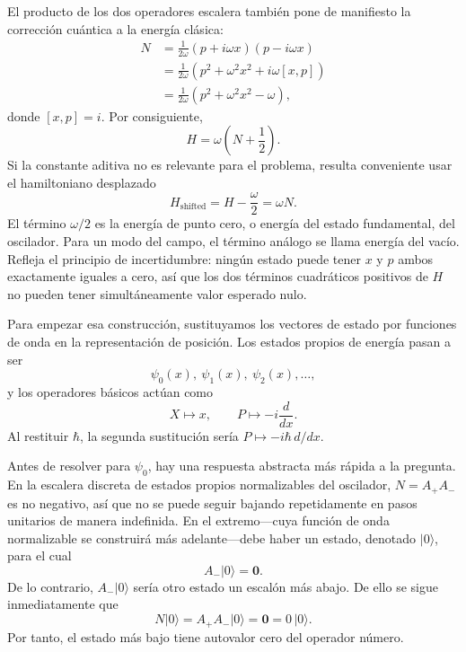 El producto de los dos operadores escalera también pone de manifiesto la corrección cuántica a la energía clásica:
\begin{align}
N
&=\frac{1}{2\omega}(p+i\omega x)(p-i\omega x)\\
&=\frac{1}{2\omega}\left(p^{2}+\omega^{2}x^{2}
 +i\omega[x,p]\right)\\
&=\frac{1}{2\omega}\left(p^{2}+\omega^{2}x^{2}-\omega\right),
\end{align}
donde \([x,p]=i\). Por consiguiente,
\begin{equation}
H=\omega\left(N+\frac12\right).
\end{equation}
Si la constante aditiva no es relevante para el problema, resulta conveniente usar el hamiltoniano desplazado
\begin{equation}
H_{\mathrm{shifted}}=H-\frac{\omega}{2}=\omega N.
\end{equation}
El término \(\omega/2\) es la energía de punto cero, o energía del estado fundamental, del oscilador. Para un modo del campo, el término análogo se llama energía del vacío. Refleja el principio de incertidumbre: ningún estado puede tener \(x\) y \(p\) ambos exactamente iguales a cero, así que los dos términos cuadráticos positivos de \(H\) no pueden tener simultáneamente valor esperado nulo.

\begin{classroomqa}
\end{classroomqa}

Para empezar esa construcción, sustituyamos los vectores de estado por funciones de onda en la representación de posición. Los estados propios de energía pasan a ser
\[
\psi_{0}(x),\ \psi_{1}(x),\ \psi_{2}(x),\ldots,
\]
y los operadores básicos actúan como
\begin{equation}
X\longmapsto x,\qquad
P\longmapsto -i\frac{d}{dx}.
\end{equation}
Al restituir \(\hbar\), la segunda sustitución sería
\(P\mapsto-i\hbar\,d/dx\).

Antes de resolver para \(\psi_{0}\), hay una respuesta abstracta más rápida a la pregunta. En la escalera discreta de estados propios normalizables del oscilador, \(N=A_{+}A_{-}\) es no negativo, así que no se puede seguir bajando repetidamente en pasos unitarios de manera indefinida. En el extremo---cuya función de onda normalizable se construirá más adelante---debe haber un estado, denotado \(\lvert0\rangle\), para el cual
\begin{equation}
A_{-}\lvert0\rangle=\mathbf 0.
\end{equation}
De lo contrario, \(A_{-}\lvert0\rangle\) sería otro estado un escalón más abajo. De ello se sigue inmediatamente que
\begin{equation}
N\lvert0\rangle
=A_{+}A_{-}\lvert0\rangle
=\mathbf 0
=0\,\lvert0\rangle.
\end{equation}
Por tanto, el estado más bajo tiene autovalor cero del operador número.

